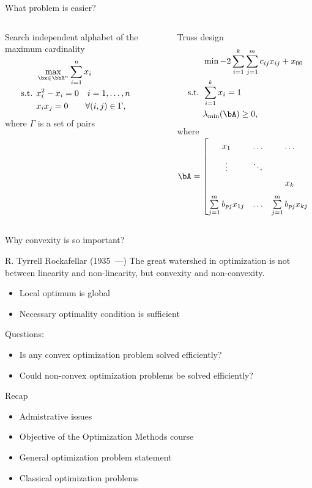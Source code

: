\documentclass[12pt]{beamer}
\begin{document}
\begin{frame}{What problem is easier?}

\begin{columns}[T]
\begin{column}{0.5\textwidth}
Search independent alphabet of the maximum cardinality
\begin{equation*}
\begin{split}
&\max\limits_{\bx \in \bbR^n} \sum\limits_{i=1}^n x_i\\
\text{s.t. } & x_i^2 - x_i = 0 \quad i = 1,\ldots, n\\
& x_ix_j = 0 \qquad \forall (i, j) \in \Gamma,
\end{split}
\end{equation*}
where $\Gamma$ is a set of pairs
\end{column}
~
\begin{column}{0.5\textwidth}
\small
Truss design
\begin{equation*}
\begin{split}
& \min -2\sum\limits_{i=1}^k\sum\limits_{j=1}^m c_{ij} x_{ij} + x_{00}\\
\text{s.t. } & \sum\limits_{i=1}^k x_i = 1\\
& \lambda_{\min}(\bA) \geq 0,
\end{split}
\end{equation*}
\scriptsize
where $\bA = 
\begin{bmatrix}
x_1 & \ldots & \ldots & \sum\limits_{j=1}^m b_{pj}x_{1j}\\
\vdots & \ddots & & \vdots\\
 & & x_k & \sum\limits_{j=1}^m b_{pj}x_{kj}\\
\sum\limits_{j=1}^m b_{pj}x_{1j} & \ldots & \sum\limits_{j=1}^m b_{pj}x_{kj} & x_{00}
\end{bmatrix}
$
\end{column}
\end{columns}

\end{frame}

\begin{frame}{Why convexity is so important?}
\begin{block}{R. Tyrrell Rockafellar (1935~---)}
The great watershed in optimization is not between linearity and
non-linearity, but convexity and non-convexity.
\end{block}
\begin{itemize}
\item Local optimum is global
\item Necessary optimality condition is sufficient
\end{itemize}
Questions:
\begin{itemize}
\item Is any convex optimization problem solved efficiently?
\item Could non-convex optimization problems be solved efficiently?
\end{itemize}
\end{frame}

\begin{frame}{Recap}
\begin{itemize}
\item Admistrative issues
\item Objective of the Optimization Methods course
\item General optimization problem statement
\item Classical optimization problems
\end{itemize}
\end{frame}
\end{document}
